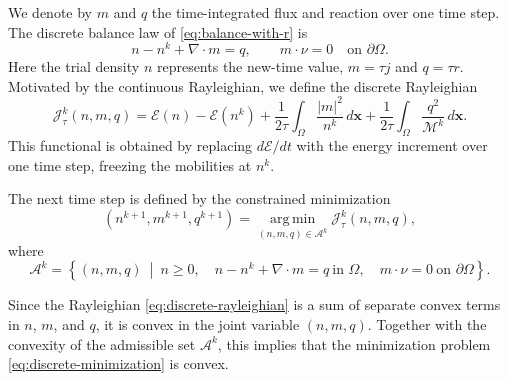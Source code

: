\documentclass[11pt]{article}
\theoremstyle{plain}
\numberwithin{equation}{section}
\newtheorem{remark}{Remark}[section]
\begin{document}
We denote by \(m\) and \(q\) the time-integrated flux and reaction over one
time step. The discrete balance law of \eqref{eq:balance-with-r} is
\begin{equation}\label{eq:discrete-balance}
    n-n^k+\nabla\cdot m=q,
    \qquad
    m\cdot\nu=0
    \quad \text{on }\partial\Omega .
\end{equation}
Here the trial density \(n\) represents the new-time value, \(m=\tau j\) and \(q=\tau r\). 
Motivated by the
continuous Rayleighian, we define the discrete Rayleighian
\begin{equation}\label{eq:discrete-rayleighian}
    \mathcal J_\tau^k(n,m,q)
    =
    \mathcal E(n) - \mathcal E(n^k)
    +
    \frac{1}{2\tau}\int_\Omega \frac{|m|^2}{n^k}\,d\mathbf{x}
    +
    \frac{1}{2\tau}\int_\Omega \frac{q^2}{\mathcal M^k}\,d\mathbf{x} .
\end{equation}
This functional is obtained by replacing \(d\mathcal E/dt\) with the energy
increment over one time step, freezing the mobilities at \(n^k\).



The next time step is defined by the constrained minimization
\begin{equation}\label{eq:discrete-minimization}
    (n^{k+1},m^{k+1},q^{k+1})
    =
    \operatorname*{arg\,min}_{(n,m,q)\in\mathcal A^k}
    \mathcal J_\tau^k(n,m,q),
\end{equation}
where
\begin{equation}\label{eq:admissible-set}
    \mathcal A^k
    =
    \left\{
    (n,m,q)\ \middle|\
    n\ge0,\quad
    n-n^k+\nabla\cdot m=q \ \text{in }\Omega,\quad
    m\cdot\nu=0 \ \text{on }\partial\Omega
    \right\}.
\end{equation}

Since the Rayleighian \eqref{eq:discrete-rayleighian} is a sum of separate convex terms in \(n\), \(m\), and
\(q\), it is convex in the joint variable \((n,m,q)\). 
Together with the convexity of the admissible set \(\mathcal A^k\),  this implies that the minimization problem \eqref{eq:discrete-minimization} is convex. 
\end{document}
